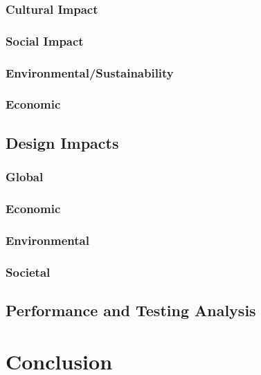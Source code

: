 \documentclass[12pt]{article}
\begin{document}
\subsubsection{Cultural Impact}

\subsubsection{Social Impact}

\subsubsection{Environmental/Sustainability}

\subsubsection{Economic}


\subsection{Design Impacts}

\subsubsection{Global}

\subsubsection{Economic}

\subsubsection{Environmental}

\subsubsection{Societal}


\subsection{Performance and Testing Analysis}


\section{Conclusion}
\end{document}
